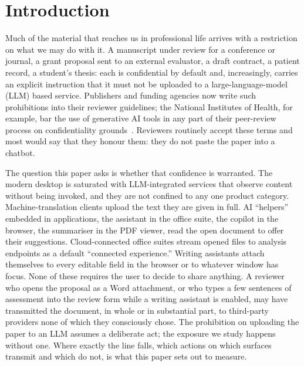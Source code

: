 \documentclass[sigconf,anonymous,review,balance=false]{acmart}
\begin{document}

\maketitle


\section{Introduction}
\label{sec:intro}

Much of the material that reaches us in professional life arrives with a restriction on
what we may do with it. A manuscript under review for a conference or journal, a grant
proposal sent to an external evaluator, a draft contract, a patient record, a student's
thesis: each is confidential by default and, increasingly, carries an explicit instruction
that it must not be uploaded to a large-language-model (LLM) based service. Publishers and
funding agencies now write such prohibitions into their reviewer guidelines; the National
Institutes of Health, for example, bar the use of generative AI tools in any part of their
peer-review process on confidentiality grounds~\cite{nih2023genai}. Reviewers routinely
accept these terms and most would say that they honour them: they do not paste the paper
into a chatbot.

The question this paper asks is whether that confidence is warranted. The modern desktop
is saturated with LLM-integrated services that observe content without being invoked, and
they are not confined to any one product category. Machine-translation clients upload the
text they are given in full. AI ``helpers'' embedded in applications, the assistant in the
office suite, the copilot in the browser, the summariser in the PDF viewer, read the open
document to offer their suggestions. Cloud-connected office suites stream opened files to
analysis endpoints as a default ``connected experience.'' Writing assistants attach
themselves to every editable field in the browser or to whatever window has focus. None of
these requires the user to decide to share anything. A reviewer who opens the proposal as a
Word attachment, or who types a few sentences of assessment into the review form while a
writing assistant is enabled, may have transmitted the document, in whole or in substantial
part, to third-party providers none of which they consciously chose. The prohibition on
uploading the paper to an LLM assumes a deliberate act; the exposure we study happens
without one. Where exactly the line falls, which actions on which surfaces transmit and
which do not, is what this paper sets out to measure.
\end{document}
